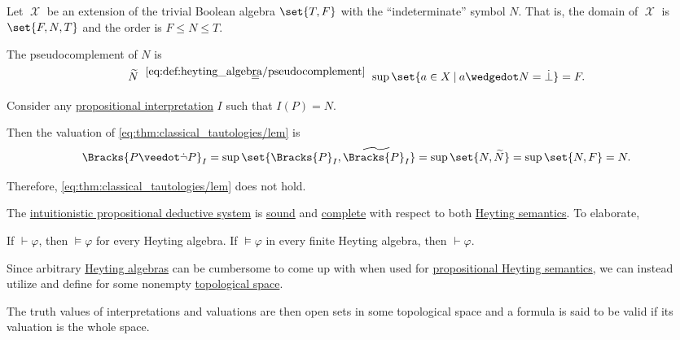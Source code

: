 \begin{example}\label{ex:heyting_semantics_lem_counterexample}
  Let \( \mscrX \) be an extension of the trivial Boolean algebra \( \set{ T, F } \) with the \enquote{indeterminate} symbol \( N \). That is, the domain of \( \mscrX \) is \( \set{ F, N, T } \) and the order is \( F \leq N \leq T \).

  The pseudocomplement of \( N \) is
  \begin{equation*}
    \widetilde{N}
    \reloset {\eqref{eq:def:heyting_algebra/pseudocomplement}} =
    \sup\set{ a \in X \given a \synwedge N = \synbot }
    =
    F.
  \end{equation*}

  Consider any \hyperref[def:propositional_valuation]{propositional interpretation} \( I \) such that \( I(P) = N \).

  Then the valuation of \eqref{eq:thm:classical_tautologies/lem} is
  \begin{equation*}
    \Bracks{P \synvee \synneg P}_I
    =
    \sup\set{ \Bracks{P}_I, \widetilde{\Bracks{P}_I} }
    =
    \sup\set{ N, \widetilde{N} }
    =
    \sup\set{ N, F }
    =
    N.
  \end{equation*}

  Therefore, \eqref{eq:thm:classical_tautologies/lem} does not hold.
\end{example}

\begin{theorem}\label{thm:intuitionistic_propositional_logic_is_sound_and_complete}
  The \hyperref[def:intuitionistic_propositional_deduction_systems]{intuitionistic propositional deductive system} is \hyperref[def:logical_framework/soundness]{sound} and \hyperref[def:logical_framework/completeness]{complete} with respect to both \hyperref[def:propositional_heyting_algebra_semantics]{Heyting semantics}. To elaborate,
  \begin{thmenum}
     If \( \vdash \varphi \), then \( \vDash \varphi \) for every Heyting algebra.
     If \( \vDash \varphi \) in every finite Heyting algebra, then \( \vdash \varphi \).
  \end{thmenum}
\end{theorem}

\begin{definition}\label{def:propositional_topological_semantics}
  Since arbitrary \hyperref[def:heyting_algebra]{Heyting algebras} can be cumbersome to come up with when used for \hyperref[def:propositional_heyting_algebra_semantics]{propositional Heyting semantics}, we can instead utilize  and define  for some nonempty \hyperref[def:topological_space]{topological space}.

  The truth values of interpretations and valuations are then open sets in some topological space and a formula is said to be valid if its valuation is the whole space.
\end{definition}

